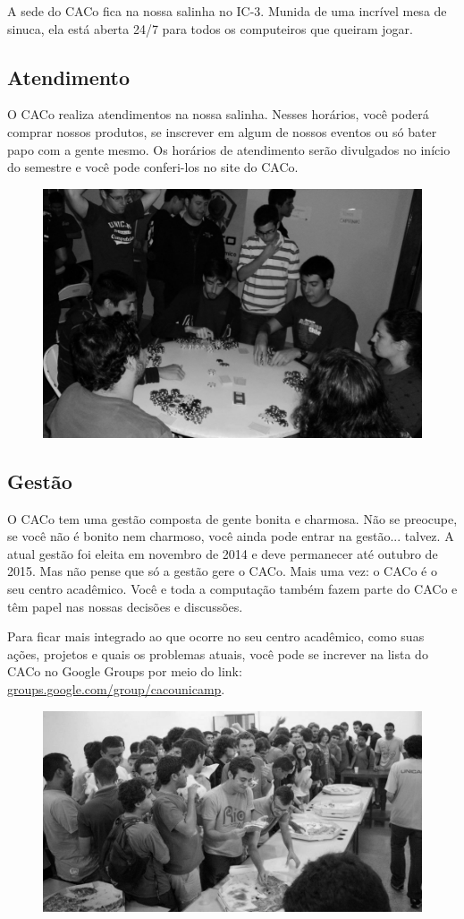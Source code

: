 A sede do CACo fica na nossa salinha no IC-3. Munida de uma incrível mesa de
sinuca, ela está aberta 24/7 para todos os computeiros que queiram jogar.

\subsection{Atendimento}

O CACo realiza atendimentos na nossa salinha. Nesses horários, você poderá
comprar nossos produtos, se inscrever em algum de nossos eventos ou só bater
papo com a gente mesmo. Os horários de atendimento serão divulgados no início do
semestre e você pode conferi-los no site do CACo.

\begin{figure}[H]
    \centering
    \includegraphics[width=.45\textwidth]{img/alem_da_graduacao/caco_poker1.jpg}
\end{figure}

\subsection{Gestão}

O CACo tem uma gestão composta de gente bonita e charmosa. Não se preocupe, se
você não é bonito nem charmoso, você ainda pode entrar na gestão... talvez. A
atual gestão foi eleita em novembro de 2014 e deve permanecer até outubro de
2015. Mas não pense que só a gestão gere o CACo. Mais uma vez: o CACo é o seu
centro acadêmico. Você e toda a computação também fazem parte do CACo e têm
papel nas nossas decisões e discussões.

Para ficar mais integrado ao que ocorre no seu centro acadêmico, como suas
ações, projetos e quais os problemas atuais, você pode se increver na lista do
CACo no Google Groups por meio do link:
\url{groups.google.com/group/cacounicamp}.

\begin{figure}[H]
    \centering
    \includegraphics[width=.45\textwidth]{img/alem_da_graduacao/caco_pizzada2.jpg}
\end{figure}

